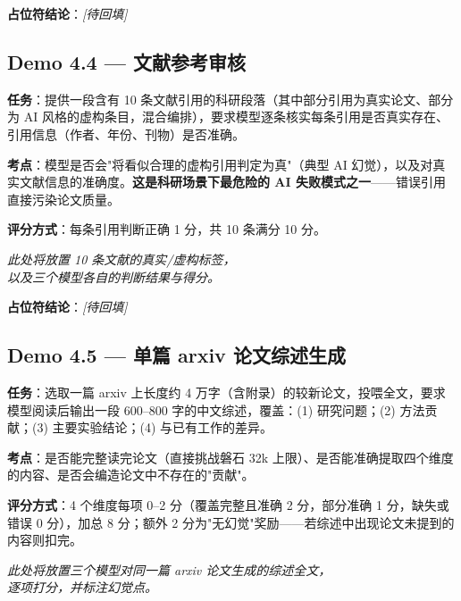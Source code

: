\textbf{占位符结论}：\textit{[待回填]}

\subsection{Demo 4.4 — 文献参考审核}

\textbf{任务}：提供一段含有 10 条文献引用的科研段落（其中部分引用为真实论文、部分为 AI 风格的虚构条目，混合编排），要求模型逐条核实每条引用是否真实存在、引用信息（作者、年份、刊物）是否准确。

\textbf{考点}：模型是否会"将看似合理的虚构引用判定为真"（典型 AI 幻觉），以及对真实文献信息的准确度。\textbf{这是科研场景下最危险的 AI 失败模式之一}——错误引用直接污染论文质量。

\textbf{评分方式}：每条引用判断正确 1 分，共 10 条满分 10 分。

\begin{placeholder}[title={占位符 4.4：10 条文献逐条核验结果}]
\vspace{1cm}
\centering\itshape\small 此处将放置 10 条文献的真实/虚构标签，\\
以及三个模型各自的判断结果与得分。
\vspace{1cm}
\end{placeholder}

\textbf{占位符结论}：\textit{[待回填]}

\subsection{Demo 4.5 — 单篇 arxiv 论文综述生成}

\textbf{任务}：选取一篇 arxiv 上长度约 4 万字（含附录）的较新论文，投喂全文，要求模型阅读后输出一段 600--800 字的中文综述，覆盖：(1) 研究问题；(2) 方法贡献；(3) 主要实验结论；(4) 与已有工作的差异。

\textbf{考点}：是否能完整读完论文（直接挑战磐石 32k 上限）、是否能准确提取四个维度的内容、是否会编造论文中不存在的"贡献"。

\textbf{评分方式}：4 个维度每项 0--2 分（覆盖完整且准确 2 分，部分准确 1 分，缺失或错误 0 分），加总 8 分；额外 2 分为"无幻觉"奖励——若综述中出现论文未提到的内容则扣完。

\begin{placeholder}[title={占位符 4.5：三模型综述输出对比 + 评分}]
\vspace{1.2cm}
\centering\itshape 此处将放置三个模型对同一篇 arxiv 论文生成的综述全文，\\
逐项打分，并标注幻觉点。
\vspace{1.2cm}
\end{placeholder}

